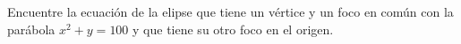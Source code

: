\item Encuentre la ecuación de la elipse que tiene un vértice y un foco en común con la parábola $x^2 + y = 100$ y que tiene su otro foco en el origen.
